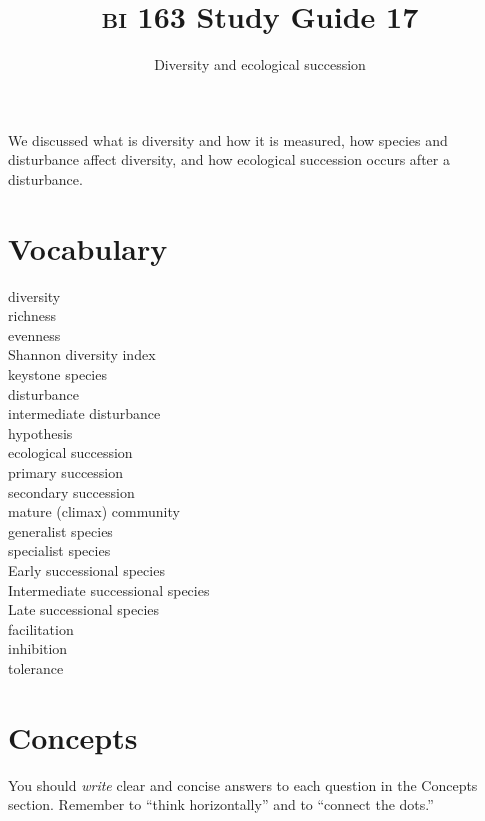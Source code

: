 \documentclass[letterpaper]{tufte-handout}
\title{{\scshape bi} 163 Study Guide 17}
\author{Diversity and ecological succession}
\date{} %
\begin{document}
\maketitle	%

We discussed what is diversity and how it is measured, how species and disturbance affect diversity, and how ecological succession occurs after a disturbance.

\section*{Vocabulary}

\vspace{-1\baselineskip}
\begin{multicols}{2}
diversity \\
richness \\
evenness \\
Shannon diversity index \\
keystone species \\
disturbance \\
intermediate disturbance\\ \hspace*{1em} hypothesis \\
ecological succession \\
primary succession \\
secondary succession \\
mature (climax) community \\
generalist species \\
specialist species \\
Early successional species \\
Intermediate successional species \\
Late successional species \\
facilitation \\
inhibition \\
tolerance
\end{multicols}

\section*{Concepts}

You should \emph{write} clear and concise answers to each question in the Concepts section.  Remember to ``think horizontally'' and to ``connect the dots.'' 
\end{document}
